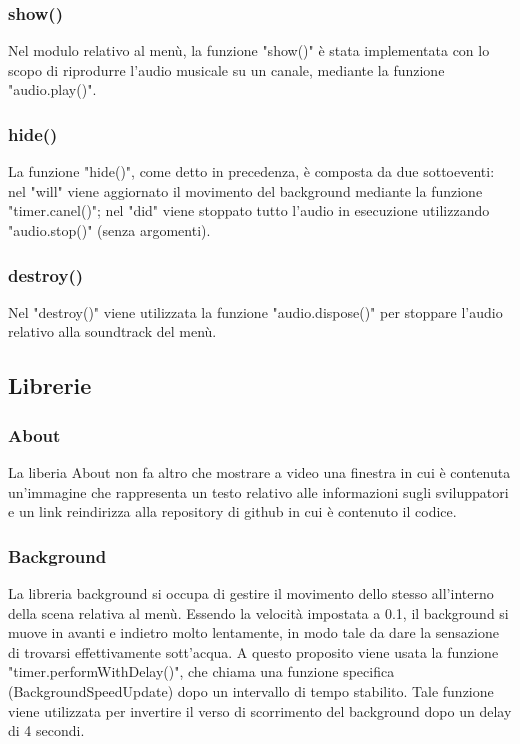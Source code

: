 \documentclass[15pt]{article}
\begin{document}
\subsubsection{show()}
Nel modulo relativo al menù, la funzione "show()" è stata implementata con lo scopo di riprodurre l'audio musicale su un canale, mediante la funzione "audio.play()".

\subsubsection{hide()}
La funzione "hide()", come detto in precedenza, è composta da due sottoeventi:  nel "will" viene aggiornato il movimento del background mediante la funzione "timer.canel()"; nel "did" viene stoppato tutto l'audio in esecuzione utilizzando "audio.stop()" (senza argomenti).

\subsubsection{destroy()}
Nel "destroy()" viene utilizzata la funzione "audio.dispose()" per stoppare l'audio relativo alla soundtrack del menù. 

\subsection{Librerie}
\subsubsection{About}
La liberia About non fa altro che mostrare a video una finestra in cui è contenuta un'immagine che rappresenta un testo relativo alle informazioni sugli sviluppatori e un link reindirizza alla repository di github in cui è contenuto il codice. 

\subsubsection{Background}
La libreria background si occupa di gestire il movimento dello stesso all'interno della scena relativa al menù. Essendo la velocità impostata a 0.1, il background si muove in avanti e indietro molto lentamente, in modo tale da dare la sensazione di trovarsi effettivamente sott'acqua. A questo proposito viene usata la funzione "timer.performWithDelay()", che chiama una funzione specifica (BackgroundSpeedUpdate) dopo un intervallo di tempo stabilito. Tale funzione viene utilizzata per invertire il verso di scorrimento del background dopo un delay di 4 secondi. 
\end{document}
